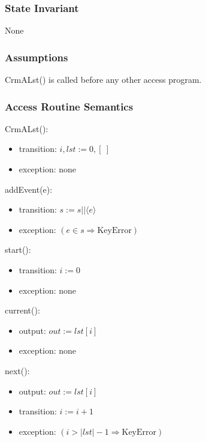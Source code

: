 \documentclass[12pt]{article}
\begin{document}
\subsubsection* {State Invariant}

None

\subsubsection* {Assumptions}

CrmALst() is called before any other access program.

\subsubsection* {Access Routine Semantics}

\noindent CrmALst():
\begin{itemize}
\item transition: $i, lst := 0, [ ~]$
\item exception: none
\end{itemize}

\noindent addEvent(e):
\begin{itemize}
\item transition: $s := s || \langle e \rangle $
\item exception: $(e \in s \Rightarrow \text{KeyError} )$
\end{itemize}

\noindent start():
\begin{itemize}
\item transition: $i := 0$
\item exception: none
\end{itemize}

\noindent current():
\begin{itemize}
\item output: $out := lst[i]$
\item exception: none
\end{itemize}

\noindent next():
\begin{itemize}
\item output: $out := lst[i]$ 
\item transition: $i := i+1$
\item exception: $(i > |lst| - 1 \Rightarrow \text{KeyError} )$
\end{itemize}


\newpage

\end{document}
